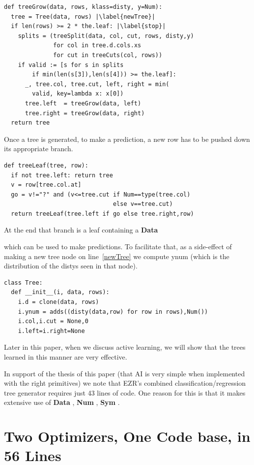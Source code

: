 \documentclass[AMA,STIX2COL]{WileyNJDv5}
\newcommand{\cls}[1]{%
  \setlength{\fboxsep}{1.5pt}%
  \colorbox{clsbg}{\sffamily\bfseries{#1}}%
}
\begin{document}
{\begin{verbatim}
def treeGrow(data, rows, klass=disty, y=Num): 
  tree = Tree(data, rows) |\label{newTree}|
  if len(rows) >= 2 * the.leaf: |\label{stop}|
    splits = (treeSplit(data, col, cut, rows, disty,y)
              for col in tree.d.cols.xs
              for cut in treeCuts(col, rows))
    if valid := [s for s in splits
        if min(len(s[3]),len(s[4])) >= the.leaf]:
      _, tree.col, tree.cut, left, right = min(
        valid, key=lambda x: x[0])
      tree.left  = treeGrow(data, left)
      tree.right = treeGrow(data, right)
  return tree
\end{verbatim}
 Once a tree is generated,
 to make a prediction, a new row has to be pushed down its appropriate
branch. 
\begin{verbatim}
def treeLeaf(tree, row): 
  if not tree.left: return tree
  v = row[tree.col.at]
  go = v!="?" and (v<=tree.cut if Num==type(tree.col) 
                               else v==tree.cut)
  return treeLeaf(tree.left if go else tree.right,row)
\end{verbatim}
At the end that branch is a leaf containing a \cls{Data}
which can be used to make predictions.
To facilitate that, as a side-effect of making a new tree node on line~\ref{newTree}
we compute \textsf{ynum} (which is the distribution of 
the \textsf{disty}s seen in that node).
\begin{verbatim}
class Tree: 
  def __init__(i, data, rows):
    i.d = clone(data, rows)
    i.ynum = adds((disty(data,row) for row in rows),Num())
    i.col,i.cut = None,0
    i.left=i.right=None
\end{verbatim}
 Later in this paper, when we discuss active learning, we will show
 that the trees learned in this manner are very effective.
 
  In support of the thesis of this paper
  (that AI is very simple
  when implemented with the right primitives) we note that EZR's
  combined classification/regression tree  generator
  requires just 43 lines of code.
One reason for this is that it makes extensive use of 
\cls{Data}, \cls{Num}, \cls{Sym}.
  
\section{Two Optimizers, One Code base, in 56 Lines}\label{sec:opt}

}
\end{document}
